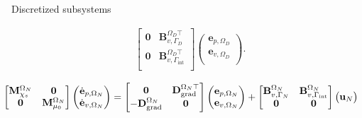 \documentclass[aspectratio=169]{ISAE-Beamer}
\DeclareMathOperator*{\grad}{grad}
\renewcommand{\div}{\operatorname{div}}
\begin{document}
\begin{frame}{Discretized subsystems}
\begin{tcolorbox}[colframe=blue,title=Subdomain $\Omega_D$ (I.B.P. $\grad$),  coltitle=white]
\begin{equation*}
\begin{aligned}
	\begin{bmatrix}
	\mathbf{0} & \mathbf{B}_{v, \Gamma_{D}}^{\Omega_D \top} \\ 
	\mathbf{0} & \mathbf{B}_{v, \Gamma_{\text{int}}}^{\Omega_D \top} \\ 
	\end{bmatrix}
	\begin{pmatrix}
	{\mathbf{e}}_{p, \Omega_D} \\
	{\mathbf{e}}_{v, \Omega_D} \\
	\end{pmatrix}.
	\end{aligned}	
	\end{equation*}
\end{tcolorbox} 
\begin{tcolorbox}[colframe=red,title=Subdomain $\Omega_N$ (I.B.P. $\div$), coltitle=white]%
	\setlength{\abovedisplayskip}{1pt}
	\setlength{\belowdisplayskip}{1pt}
	\begin{equation*}
	\hspace*{-0.3cm}
	\begin{aligned}
	\begin{bmatrix}
	\mathbf{M}_{\chi_s}^{\Omega_N} & \mathbf{0} \\
	\mathbf{0} & \mathbf{M}_{\mu_0}^{\Omega_N} \\
	\end{bmatrix}
	\begin{pmatrix}
	\dot{\mathbf{e}}_{p, \Omega_N} \\
	\dot{\mathbf{e}}_{v, \Omega_N} \\
	\end{pmatrix}
	&= \begin{bmatrix}
	\mathbf{0} & \mathbf{D}_{\grad}^{\Omega_N \top}\\
	-\mathbf{D}_{\grad}^{\Omega_N} & \mathbf{0}\\
	\end{bmatrix}
	\begin{pmatrix}
	{\mathbf{e}}_{p, \Omega_N}\\
	{\mathbf{e}}_{v, \Omega_N}\\
	\end{pmatrix} + \begin{bmatrix}
	\mathbf{B}_{v, \Gamma_{N}}^{\Omega_N} & \mathbf{B}_{v, \Gamma_{\text{int}}}^{\Omega_N}\\
	\mathbf{0} & \mathbf{0}\\
	\end{bmatrix}
	\begin{pmatrix}
	\mathbf{u}_N \\

\end{pmatrix}
\end{aligned}
\end{equation*}
\end{tcolorbox}
\end{frame}
\end{document}

